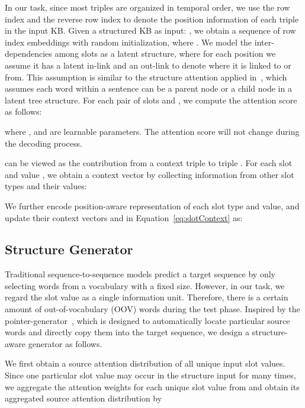 \documentclass[11pt,a4paper]{article}
\begin{document}
In our task, since most triples are organized in temporal order, we use the row index  and the reverse row index  to denote the position information of each triple in the input KB. Given a structured KB as input: , we obtain a sequence of row index embeddings  with random initialization, where . We model the inter-dependencies among slots as a latent structure, where for each position  we assume it has a latent in-link and an out-link to denote where it is linked to or from. This assumption is similar to the structure attention applied in~, which assumes each word within a sentence can be a parent node or a child node in a latent tree structure. For each pair of slots  and , we compute the attention score  as follows:





where , and  are learnable parameters.
The attention score will not change during the decoding process. 

 can be viewed as the contribution from a context triple  to triple . For each slot  and value , we obtain a context vector by collecting information from other slot types and their values:


 

We further encode position-aware representation of each slot type and value, and update their context vectors  and  in Equation~\ref{eq:slotContext} as:










\subsection{Structure Generator}

Traditional sequence-to-sequence models predict a target sequence by only selecting words from a vocabulary with a fixed size. However, in our task, we regard the slot value as a single information unit. Therefore, there is a certain amount of out-of-vocabulary (OOV) words during the test phase. Inspired by the pointer-generator~\cite{copy16,hybridp17}, which is designed to automatically locate particular source words and directly copy them into the target sequence, we design a structure-aware generator as follows.

We first obtain a source attention distribution of all unique input slot values. Since one particular slot value may occur in the structure input for many times, we aggregate the attention weights for each unique slot value  from  and obtain its aggregated source attention distribution  by
\end{document}
